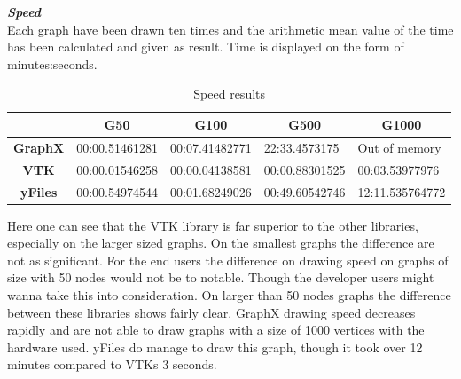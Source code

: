 \documentclass[a4paper,11pt]{kth-mag}
\begin{document}
\begin{appendices}
\label{sec:library:results}
\textbf{\textit{Speed}}\\
\newline
Each graph have been drawn ten times and the arithmetic mean value of the time has been calculated and given as result. Time is displayed on the form of minutes:seconds.\
\newline
\begin{table}[h]
\centering
\caption{Speed results}
\begin{tabular}{|c|l|l|l|l|}
\hline
\multicolumn{1}{|l|}{} & \multicolumn{1}{c|}{\textbf{G50}} & \multicolumn{1}{c|}{\textbf{G100}} & \multicolumn{1}{c|}{\textbf{G500}} & \multicolumn{1}{c|}{\textbf{G1000}} \\ \hline
\textbf{GraphX}        & 00:00.51461281                    & 00:07.41482771                     & 22:33.4573175                      & Out of memory                       \\ \hline
\textbf{VTK}           & 00:00.01546258                    & 00:00.04138581                     & 00:00.88301525                     & 00:03.53977976                      \\ \hline
\textbf{yFiles}        & 00:00.54974544                    & 00:01.68249026                     & 00:49.60542746                     & 12:11.535764772                     \\ \hline
\end{tabular}
\label{table:librarie-speed:appendix}
\end{table}
\newline
Here one can see that the VTK library is far superior to the other libraries, especially on the larger sized graphs. 
On the smallest graphs the difference are not as significant. For the end users the difference on drawing speed on graphs of size with 50 nodes would not be to notable.
Though the developer users might wanna take this into consideration. 
On larger than 50 nodes graphs the difference between these libraries shows fairly clear. GraphX drawing speed decreases rapidly and are not able to draw graphs with a size of 1000 vertices with the hardware used.
yFiles do manage to draw this graph, though it took over 12 minutes compared to VTKs 3 seconds.\\


\end{appendices}
\end{document}
